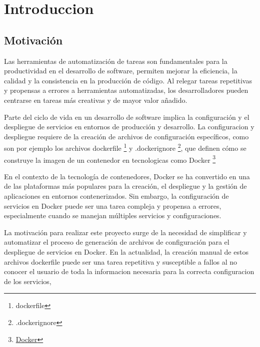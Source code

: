 \documentclass[12pt, a4paper, twoside]{article}
\begin{document}

\newpage




\newpage


\newpage

\tableofcontents
\newpage








\section{Introduccion}
\label{sec:Introduccion}

\subsection{Motivación}
Las herramientas de automatización de tareas son fundamentales para la productividad en el desarrollo de software, permiten mejorar la eficiencia, la calidad y la consistencia en la producción de código.
Al relegar tareas repetitivas y propensas a errores a herramientas automatizadas, los desarrolladores pueden centrarse en tareas más creativas y de mayor valor añadido.

Parte del ciclo de vida en un desarrollo de software implica la configuración y el despliegue de servicios en entornos de producción y desarrollo.
La configuracion y despliegue requiere de la creación de archivos de configuración específicos, como son por ejemplo los archivos dockerfile \footnote{dockerfile} y .dockerignore \footnote{.dockerignore}, que definen cómo se construye la imagen de un contenedor en tecnologicas como Docker \footnote{ \hyperref[sec:Docker]{Docker}}

En el contexto de la tecnología de contenedores, Docker se ha convertido en una de las plataformas más populares para la creación, el despliegue y la gestión de aplicaciones en entornos contenerizados. 
Sin embargo, la configuración de servicios en Docker puede ser una tarea compleja y propensa a errores, especialmente cuando se manejan múltiples servicios y configuraciones.

La motivación para realizar este proyecto surge de la necesidad de simplificar y automatizar el proceso de generación de archivos de configuración para el despliegue de servicios en Docker. 
En la actualidad, la creación manual de estos archivos dockerfile puede ser una tarea repetitiva y susceptible a fallos al no conocer el usuario de toda la informacion necesaria para la correcta configuracion de los servicios, 
\end{document}
